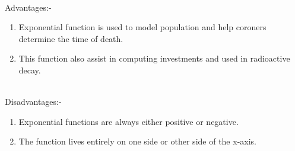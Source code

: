 \documentclass[a4paper, 11pt]{article}
\begin{document}
\\Advantages:-
\begin{enumerate}
  \item Exponential function is used to model population and help   coroners determine the time of death.
 \item  This function also assist in computing investments and used in radioactive decay.
 \end{enumerate}
 \\Disadvantages:-
\begin{enumerate}
\item Exponential functions are always either positive or negative.
\item The function lives entirely on one side or other side of the x-axis.
\end{enumerate}
\end{document}
